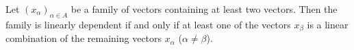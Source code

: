 Let $(x_{\alpha})_{\alpha \in A}$ be a family of vectors containing at least two vectors. Then the family is linearly dependent if and only if at least one of the vectors $x_{\beta}$ is a linear combination of the remaining vectors $x_{\alpha}$ ($\alpha \neq \beta$).
